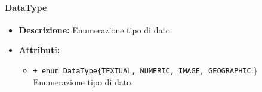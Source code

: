 \paragraph{DataType}
\label{botdatatype}
\begin{flushleft}
\begin{itemize}
\item \textbf{Descrizione:} Enumerazione tipo di dato.
\item \textbf{Attributi:}
\begin{sloppypar}
\begin{itemize}
\item \texttt{+ enum DataType\{TEXTUAL, NUMERIC, IMAGE, GEOGRAPHIC}:\}\\ Enumerazione tipo di dato.
\end{itemize}
\end{sloppypar}
\end{itemize}
\end{flushleft}

